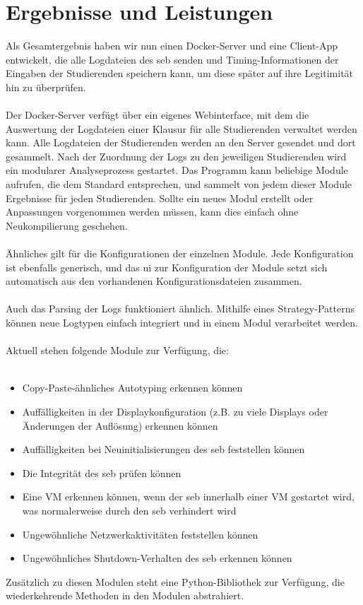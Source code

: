 \chapter{Ergebnisse und Leistungen} \label{ch:ergebnisse}
Als Gesamtergebnis haben wir nun einen Docker-Server und eine Client-App entwickelt, die alle Logdateien des \gls{seb} senden und Timing-Informationen der Eingaben der Studierenden speichern kann, um diese später auf ihre Legitimität hin zu überprüfen.\\
\\
Der Docker-Server verfügt über ein eigenes Webinterface, mit dem die Auswertung der Logdateien einer Klausur für alle Studierenden verwaltet werden kann. 
Alle Logdateien der Studierenden werden an den Server gesendet und dort gesammelt. 
Nach der Zuordnung der Logs zu den jeweiligen Studierenden wird ein modularer Analyseprozess gestartet. 
Das Programm kann beliebige Module aufrufen, die dem Standard entsprechen, und sammelt von jedem dieser Module Ergebnisse für jeden Studierenden. 
Sollte ein neues Modul erstellt oder Anpassungen vorgenommen werden müssen, kann dies einfach ohne Neukompilierung geschehen.\\
\\
Ähnliches gilt für die Konfigurationen der einzelnen Module. 
Jede Konfiguration ist ebenfalls generisch, und das \gls{ui} zur Konfiguration der Module setzt sich automatisch aus den vorhandenen Konfigurationsdateien zusammen.\\
\\
Auch das Parsing der Logs funktioniert ähnlich. Mithilfe eines Strategy-Patterns können neue Logtypen einfach integriert und in einem Modul verarbeitet werden.\\
\\
Aktuell stehen folgende Module zur Verfügung, die:\\
\\
\begin{itemize} 
  \item Copy-Paste-ähnliches Autotyping erkennen können 
  \item Auffälligkeiten in der Displaykonfiguration (z.B. zu viele Displays oder Änderungen der Auflösung) erkennen können 
  \item Auffälligkeiten bei Neuinitialisierungen des \gls{seb} feststellen können 
  \item Die Integrität des \gls{seb} prüfen können 
  \item Eine VM erkennen können, wenn der \gls{seb} innerhalb einer VM gestartet wird, was normalerweise durch den \gls{seb} verhindert wird   
  \item Ungewöhnliche Netzwerkaktivitäten feststellen können 
  \item Ungewöhnliches Shutdown-Verhalten des \gls{seb} erkennen können 
\end{itemize}

Zusätzlich zu diesen Modulen steht eine Python-Bibliothek zur Verfügung, die wiederkehrende Methoden in den Modulen abstrahiert.
